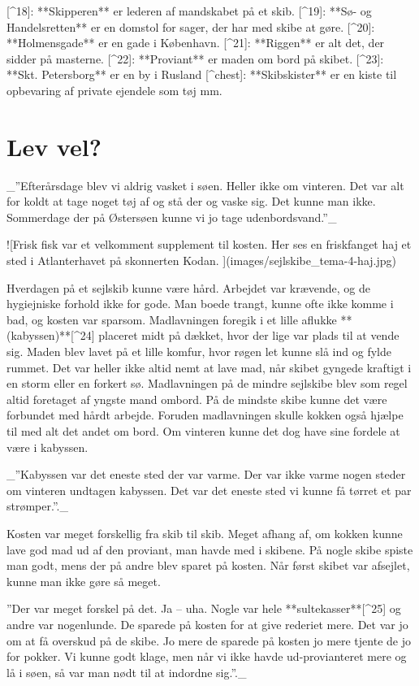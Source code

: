 \documentclass{book}
\begin{document}
[^18]: **Skipperen** er lederen af mandskabet på et skib.
[^19]: **Sø- og Handelsretten** er en domstol for sager, der har med skibe
  at gøre.
[^20]: **Holmensgade** er en gade i København.
[^21]: **Riggen** er alt det, der sidder på masterne.
[^22]: **Proviant** er maden om bord på skibet.
[^23]: **Skt. Petersborg** er en by i Rusland
[^chest]: **Skibskister** er en kiste til opbevaring af private ejendele som
  tøj mm.

\chapter{Lev vel?}

 _”Efterårsdage blev vi aldrig vasket i søen. Heller ikke om vinteren. Det var alt for
 koldt at tage noget tøj af og stå der og vaske sig. Det kunne man ikke. Sommerdage der
 på Østersøen kunne vi jo tage udenbordsvand.”_

![Frisk fisk var et velkomment supplement til kosten. Her ses en
friskfanget haj et sted i Atlanterhavet på skonnerten Kodan. ](images/sejlskibe_tema-4-haj.jpg)

Hverdagen på et sejlskib kunne være hård. Arbejdet var krævende, og de hygiejniske forhold
ikke for gode. Man boede trangt, kunne ofte ikke komme i bad, og kosten var sparsom.
Madlavningen foregik i et lille aflukke **(kabyssen)**[^24] placeret midt på dækket, hvor der lige
var plads til at vende sig. Maden blev lavet på et lille komfur, hvor røgen let kunne slå
ind og fylde rummet. Det var heller ikke altid nemt at lave mad, når skibet gyngede
kraftigt i en storm eller en forkert sø. Madlavningen på de mindre sejlskibe blev som
regel altid foretaget af yngste mand ombord. På de mindste skibe kunne det være forbundet
med hårdt arbejde. Foruden madlavningen skulle kokken også hjælpe til med alt det andet om
bord. Om vinteren kunne det dog have sine fordele at være i kabyssen.

 _”Kabyssen var det eneste sted der var varme. Der var ikke varme nogen steder om vinteren
undtagen kabyssen. Det var det eneste sted vi kunne få tørret et par strømper.”._

Kosten var meget forskellig fra skib til skib. Meget afhang af, om kokken kunne lave god
mad ud af den proviant, man havde med i skibene. På nogle skibe spiste man godt, mens der
på andre blev sparet på kosten. Når først skibet var afsejlet, kunne man ikke gøre så
meget.

”Der var meget forskel på det. Ja – uha. Nogle var hele **sultekasser**[^25] og andre var
nogenlunde. De sparede på kosten for at give rederiet mere. Det var jo om at få overskud
på de skibe. Jo mere de sparede på kosten jo mere tjente de jo for pokker. Vi kunne godt
klage, men når vi ikke havde ud-provianteret mere og lå i søen, så var man nødt til at
indordne sig.”._
\end{document}
